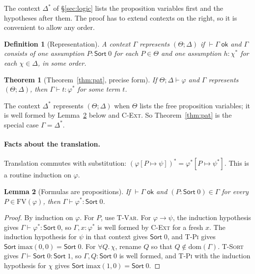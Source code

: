 \documentclass[acmsmall,screen,nonacm]{acmart}
\newtheorem{definition}{Definition}
\newtheorem{theorem}{Theorem}
\newtheorem{lemma}[theorem]{Lemma}
\newcommand{\Sort}[1]{\mathsf{Sort}\;#1}
\newcommand{\subst}[3]{#1[#2 \mapsto #3]}
\newcommand{\FV}{\mathrm{FV}}
\newcommand{\dom}{\mathrm{dom}}
\newcommand{\ctxok}[1]{\vdash #1\;\mathsf{ok}}
\newcommand{\imax}{\mathrm{imax}}
\begin{document}
The context $\Delta^\ast$ of \S\ref{sec:logic} lists the proposition variables first and the hypotheses after them.
The proof has to extend contexts on the right, so it is convenient to allow any order.

\begin{definition}[Representation]
A context $\Gamma$ \emph{represents} $(\Theta; \Delta)$ if $\ctxok{\Gamma}$ and $\Gamma$ consists of
one assumption $P : \Sort{0}$ for each $P \in \Theta$ and one assumption $h : \chi^\ast$ for each $\chi \in \Delta$, in some order.
\end{definition}

\begin{theorem}[Theorem~\ref{thm:pat}, precise form]
\label{thm:pat-precise}
If $\Theta; \Delta \vdash \varphi$ and $\Gamma$ represents $(\Theta; \Delta)$, then $\Gamma \vdash t : \varphi^\ast$ for some term $t$.
\end{theorem}

\noindent The context $\Delta^\ast$ represents $(\Theta; \Delta)$ when $\Theta$ lists the free proposition variables;
it is well formed by Lemma~\ref{lem:formula-type} below and \textsc{C-Ext}.
So Theorem~\ref{thm:pat} is the special case $\Gamma = \Delta^\ast$.

\paragraph{Facts about the translation.}
Translation commutes with substitution: $(\subst{\varphi}{P}{\psi})^\ast = \subst{\varphi^\ast}{P}{\psi^\ast}$.
This is a routine induction on $\varphi$.

\begin{lemma}[Formulas are propositions]
\label{lem:formula-type}
If $\ctxok{\Gamma}$ and $(P : \Sort{0}) \in \Gamma$ for every $P \in \FV(\varphi)$, then $\Gamma \vdash \varphi^\ast : \Sort{0}$.
\end{lemma}

\begin{proof}
By induction on $\varphi$.
For $P$, use \textsc{T-Var}.
For $\varphi \to \psi$, the induction hypothesis gives $\Gamma \vdash \varphi^\ast : \Sort{0}$,
so $\Gamma, x : \varphi^\ast$ is well formed by \textsc{C-Ext} for a fresh $x$.
The induction hypothesis for $\psi$ in that context gives $\Sort{0}$, and \textsc{T-Pi} gives $\Sort{\imax(0, 0)} = \Sort{0}$.
For $\forall Q.\,\chi$, rename $Q$ so that $Q \notin \dom(\Gamma)$.
\textsc{T-Sort} gives $\Gamma \vdash \Sort{0} : \Sort{1}$, so $\Gamma, Q : \Sort{0}$ is well formed,
and \textsc{T-Pi} with the induction hypothesis for $\chi$ gives $\Sort{\imax(1, 0)} = \Sort{0}$.
\end{proof}
\end{document}
